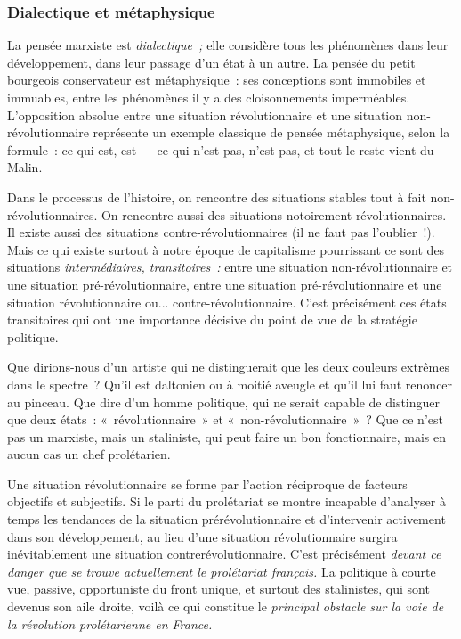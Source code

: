 \documentclass[french,twoside]{book} %
\begin{document}
\subsubsection[{Dialectique et métaphysique}]{Dialectique et métaphysique}
\noindent La pensée marxiste est \emph{dialectique ;} elle considère tous les phénomènes dans leur développement, dans leur passage d’un état à un autre. La pensée du petit bourgeois conservateur est métaphysique : ses conceptions sont immobiles et immuables, entre les phénomènes il y a des cloisonnements imperméables. L’opposition absolue entre une situation révolutionnaire et une situation non-révolutionnaire représente un exemple classique de pensée métaphysique, selon la formule : ce qui est, est — ce qui n’est pas, n’est pas, et tout le reste vient du Malin.\par
Dans le processus de l’histoire, on rencontre des situations stables tout à fait non-révolutionnaires. On rencontre aussi des situations notoirement révolutionnaires. Il existe aussi des situations contre-révolutionnaires (il ne faut pas l’oublier !). Mais ce qui existe surtout à notre époque de capitalisme pourrissant ce sont des situations \emph{intermédiaires, transitoires :} entre une situation non-révolutionnaire et une situation pré-révolutionnaire, entre une situation pré-révolutionnaire et une situation révolutionnaire ou... contre-révolutionnaire. C’est précisément ces états transitoires qui ont une importance décisive du point de vue de la stratégie politique.\par
Que dirions-nous d’un artiste qui ne distinguerait que les deux couleurs extrêmes dans le spectre ? Qu’il est daltonien ou à moitié aveugle et qu’il lui faut renoncer au pinceau. Que dire d’un homme politique, qui ne serait  capable de distinguer que deux états : « révolutionnaire » et « non-révolutionnaire » ? Que ce n’est pas un marxiste, mais un staliniste, qui peut faire un bon fonctionnaire, mais en aucun cas un chef prolétarien.\par
Une situation révolutionnaire se forme par l’action réciproque de facteurs objectifs et subjectifs. Si le parti du prolétariat se montre incapable d’analyser à temps les tendances de la situation prérévolutionnaire et d’intervenir activement dans son développement, au lieu d’une situation révolutionnaire surgira inévitablement une situation contrerévolutionnaire. C’est précisément \emph{devant ce danger que se trouve actuellement le prolétariat français.} La politique à courte vue, passive, opportuniste du front unique, et surtout des stalinistes, qui sont devenus son aile droite, voilà ce qui constitue le \emph{principal obstacle sur la voie de la révolution prolétarienne en France.}
\end{document}
